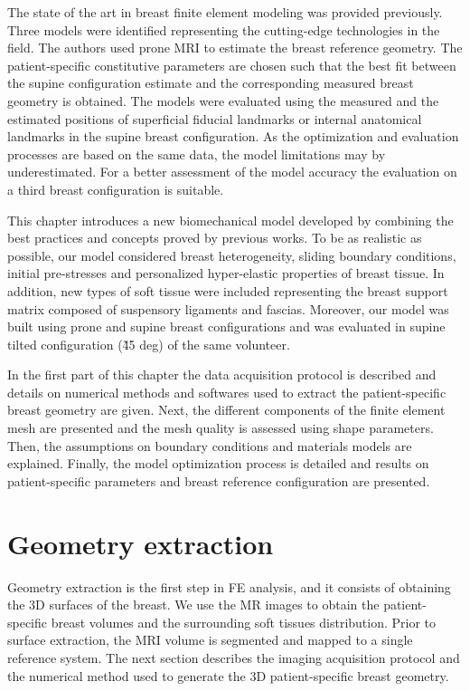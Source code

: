
The state of the art in breast finite element modeling was provided previously. Three models were identified representing the cutting-edge technologies in the field. The authors used prone MRI to estimate the breast reference geometry. The patient-specific constitutive parameters are chosen such that the best fit between the supine configuration estimate and the corresponding measured breast geometry is obtained. The models were evaluated using the measured and the estimated positions of superficial fiducial landmarks or internal anatomical landmarks in the supine breast configuration. As the optimization and evaluation  processes are based on the same data, the model limitations may by underestimated. For a better assessment of the model accuracy the evaluation on a third breast configuration is suitable.

 This chapter introduces a new biomechanical model developed by combining the best practices and concepts proved by previous works. To be as realistic as possible, our model considered breast heterogeneity, sliding boundary conditions, initial pre-stresses and personalized hyper-elastic properties of breast tissue. In addition, new types of soft tissue were included representing the breast support matrix composed of suspensory ligaments and fascias. Moreover, our model was built using prone and supine breast configurations and was evaluated in supine tilted configuration (\~ 45 deg) of the same volunteer.

In the first part of this chapter the data acquisition protocol is described and details on numerical methods and softwares used to extract the patient-specific breast geometry are given. Next, the different components of the finite element mesh are presented and the mesh quality is assessed using shape parameters.  Then, the assumptions on boundary conditions and materials models are explained. Finally, the model optimization process is detailed and results on patient-specific parameters and breast reference configuration are presented.   
\clearpage
\section{Geometry extraction}\label{section:geometryextraction}

Geometry extraction is the first step in FE analysis, and it
consists of obtaining the 3D surfaces of the
breast. We use the MR images to obtain the patient-specific breast volumes and the surrounding soft tissues distribution. Prior to surface extraction, the MRI volume is segmented and mapped to a single reference system. The next section describes the imaging acquisition protocol and the numerical method used to generate the 3D patient-specific breast geometry.

